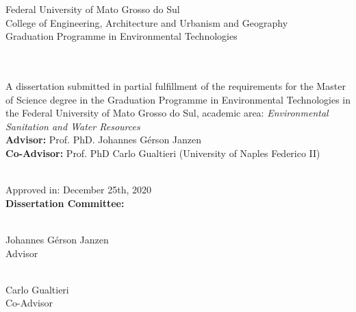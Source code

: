 \begin{center}
    \large Federal University of Mato Grosso do Sul\\
    \large College of Engineering, Architecture and Urbanism and Geography\\
    \large Graduation Programme in Environmental Technologies
    \\[1.5\baselineskip]
    \large\theauthor
    \\[1.5\baselineskip]
    \uppercase{\Large\thetitle}
    \\[1\baselineskip]
\end{center}
\hfill
\begin{minipage}{0.5\textwidth}
A dissertation submitted in partial fulfillment of the requirements for the Master of Science degree in the Graduation Programme in Environmental Technologies in the Federal University of Mato Grosso do Sul, academic area: \textit{Environmental Sanitation and Water Resources}
\\[0.5\baselineskip]
\textbf{Advisor:} Prof. PhD. Johannes Gérson Janzen\\
\textbf{Co-Advisor:} Prof. PhD Carlo Gualtieri (University of Naples Federico II)
\end{minipage}
\\[1\baselineskip]
Approved in: December 25th, 2020
\\[0.5\baselineskip]
\textbf{Dissertation Committee:}
\\[2.5\baselineskip]
\begin{minipage}{0.5\textwidth}
    \begin{center}
    \begin{minipage}{7cm}
        \hrulefill
    \end{minipage}\\
    Johannes Gérson Janzen\\
    Advisor
    \end{center}
\end{minipage}
\hfill
\begin{minipage}{0.5\textwidth}
    \begin{center}
    \begin{minipage}{7cm}
        \hrulefill
    \end{minipage}\\
    Carlo Gualtieri\\
    Co-Advisor
    \end{center}
\end{minipage}
\\[2\baselineskip]
